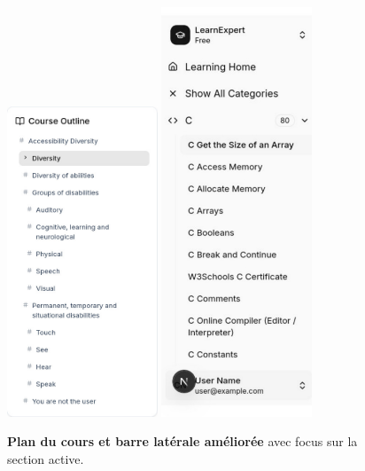 \begin{figure}[h!]
  \centering
  \includegraphics[width=0.4\textwidth,keepaspectratio]{old-reports/week_4_img/outline.jpeg}
  \includegraphics[width=0.4\textwidth,keepaspectratio]{old-reports/week_4_img/sidebare2.jpeg}
  \caption{\textbf{Plan du cours et barre latérale améliorée} avec focus sur la section active.}
  \label{fig:navigation_improved}
\end{figure}

